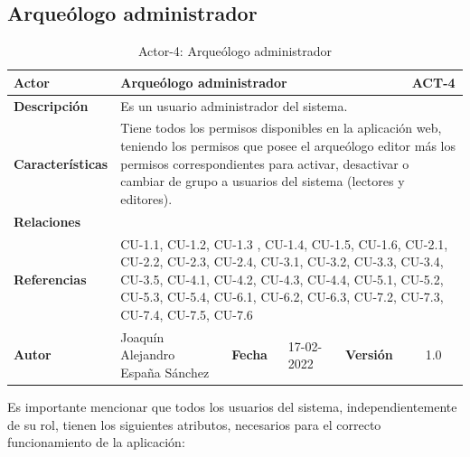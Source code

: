 \subsection{Arqueólogo administrador}
    \begin{table}[H]
    \begin{center}
        \begin{adjustbox}{width=\textwidth}
        \begin{tabular}{ | l | l | l | l | c | c | } 
            \hline
            \textbf{Actor} & \multicolumn{4}{l|}{ Arqueólogo administrador} & \cellcolor{gray!50} \textbf{ACT-4}\\
            \hline
            \textbf{Descripción} & \multicolumn{5}{p{0.9\linewidth}|}{Es un usuario
            administrador del sistema.} \\
            \hline
            \textbf{Características} & \multicolumn{5}{p{0.9\linewidth}|}{Tiene todos los
            permisos disponibles en la aplicación web, teniendo los permisos que posee el
            arqueólogo editor más los permisos correspondientes para activar, desactivar o
            cambiar de grupo a usuarios del sistema (lectores y editores).} \\
            \hline
            \textbf{Relaciones} & \multicolumn{5}{p{0.9\linewidth}|}{ } \\
            \hline
            \textbf{Referencias} & \multicolumn{5}{p{0.9\linewidth}|}{CU-1.1, CU-1.2, CU-1.3 , 
            CU-1.4, CU-1.5, CU-1.6, CU-2.1, CU-2.2, CU-2.3, CU-2.4, CU-3.1, CU-3.2, CU-3.3,
            CU-3.4, CU-3.5, CU-4.1, CU-4.2, CU-4.3, CU-4.4, CU-5.1, CU-5.2, CU-5.3, CU-5.4,
            CU-6.1, CU-6.2, CU-6.3, CU-7.2, CU-7.3, CU-7.4, CU-7.5, CU-7.6} \\
            \hline
            \textbf{Autor} & \multicolumn{1}{p{0.25\linewidth}|}{Joaquín Alejandro España Sánchez} & \textbf{Fecha} & 
            17-02-2022     & \textbf{Versión}                                                      & 1.0\\
            \hline
        \end{tabular}
        \end{adjustbox}
        \caption{Actor-4: Arqueólogo administrador}
        \label{tab:archaeologist-administrator}
    \end{center}
    \end{table}

Es importante mencionar que todos los usuarios del sistema, independientemente de su rol,
tienen los siguientes atributos, necesarios para el correcto funcionamiento de la aplicación:

